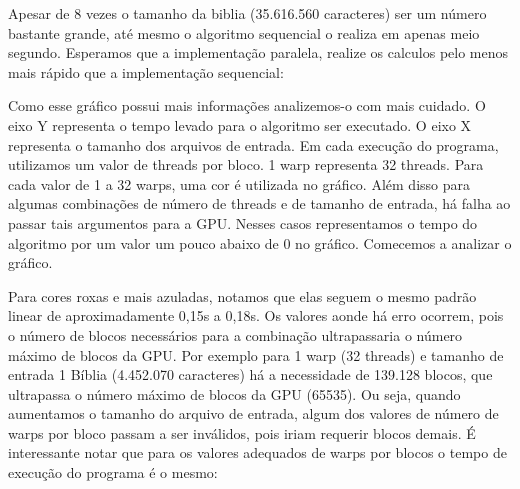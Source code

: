 \documentclass[12pt]{article}
\begin{document}
Apesar de 8 vezes o tamanho da biblia (35.616.560 caracteres) ser um número bastante grande, até mesmo o algoritmo sequencial o realiza em apenas meio segundo. Esperamos que a implementação paralela, realize os calculos pelo menos mais rápido que a implementação sequencial:

\begin{figure}[H]
\end{figure}

Como esse gráfico possui mais informações analizemos-o com mais cuidado. O eixo Y representa o tempo levado para o algoritmo ser executado. O eixo X representa o tamanho dos arquivos de entrada. Em cada execução do programa, utilizamos um valor de threads por bloco. 1 warp representa 32 threads. Para cada valor de 1 a 32 warps, uma cor é utilizada no gráfico. Além disso para algumas combinações de número de threads e de tamanho de entrada, há falha ao passar tais argumentos para a GPU. Nesses casos representamos o tempo do algoritmo por um valor um pouco abaixo de 0 no gráfico. Comecemos a analizar o gráfico.

Para cores roxas e mais azuladas, notamos que elas seguem o mesmo padrão linear de aproximadamente 0,15s a 0,18s. Os valores aonde há erro ocorrem, pois o número de blocos necessários para a combinação ultrapassaria o número máximo de blocos da GPU. Por exemplo para 1 warp (32 threads) e tamanho de entrada 1 Bíblia (4.452.070 caracteres) há a necessidade de 139.128 blocos, que ultrapassa o número máximo de blocos da GPU (65535). Ou seja, quando aumentamos o tamanho do arquivo de entrada, algum dos valores de número de warps por bloco passam a ser inválidos, pois iriam requerir blocos demais. É interessante notar que para os valores adequados de warps por blocos o tempo de execução do programa é o mesmo:
\end{document}
